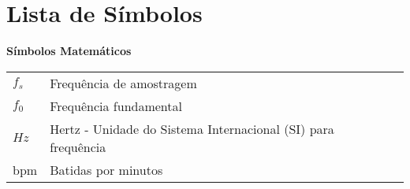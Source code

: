 
\chapter*{Lista de Símbolos}

\begin{spacing}{1.45}

\noindent \textbf{Símbolos Matemáticos}

\begin{longtable}{L{1.5cm}L{14cm}L{\textwidth}}

$f_s$ & Frequência de amostragem & \\
$f_0$ & Frequência fundamental & \\
$Hz$ & Hertz - Unidade do Sistema Internacional (SI) para frequência & \\
bpm & Batidas por minutos & \\




\end{longtable}

\end{spacing}
